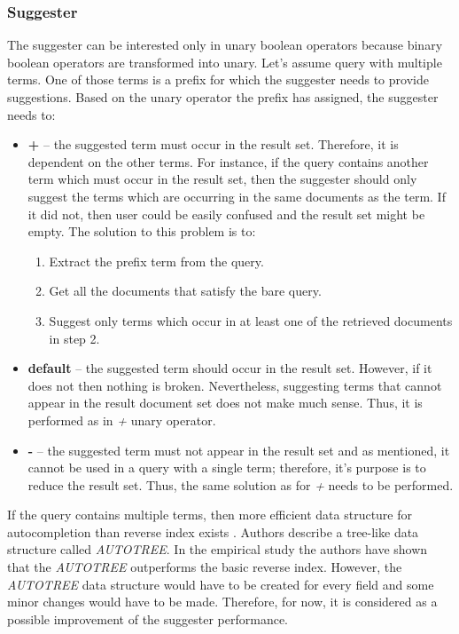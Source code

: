 \subsubsection{Suggester}
The suggester can be interested only in unary boolean operators because binary boolean operators are transformed into unary.
Let's assume query with multiple terms. One of those terms is a prefix for which the suggester needs to provide suggestions.
Based on the unary operator the prefix has assigned, the suggester needs to:
\begin{itemize}
    \item \textbf{+} – the suggested term must occur in the result set. Therefore, it is dependent on the other terms.
    For instance, if the query contains another term which must occur in the result set, then the suggester should only
    suggest the terms which are occurring in the same documents as the term. If it did not, then user could be easily
    confused and the result set might be empty. The solution to this problem is to:
    \begin{enumerate}
        \item Extract the prefix term from the query.
        \item Get all the documents that satisfy the bare query.
        \item Suggest only terms which occur in at least one of the retrieved documents in step 2.
    \end{enumerate}
    \item \textbf{default} – the suggested term should occur in the result set. However, if it does not then nothing is broken.
    Nevertheless, suggesting terms that cannot appear in the result document set does not make much sense. Thus, it is performed
    as in \textit{+} unary operator.
    \item \textbf{-} – the suggested term must not appear in the result set and as mentioned, it cannot be used in a
    query with a single term; therefore, it's purpose is to reduce the result set. Thus, the same solution as for \textit{+}
    needs to be performed.
\end{itemize}


If the query contains multiple terms, then more efficient data structure for autocompletion than reverse index exists
\citep{Bast06output-sensitiveautocompletion}. Authors describe a tree-like data structure called \textit{AUTOTREE}. In the
empirical study the authors have shown that the \textit{AUTOTREE} outperforms the basic reverse index. However,
the \textit{AUTOTREE} data structure would have to be created for every field and some minor changes would have to be made.
Therefore, for now, it is considered as a possible improvement of the suggester performance.

